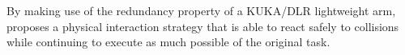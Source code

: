 By making use of the redundancy property of a KUKA/DLR lightweight arm, \cite{de2008exploiting} proposes a physical interaction strategy that is able to react safely to collisions while continuing to execute as much possible of the original task. 
%
%
%
%
%
%
%
%
%
%
%
%
%
%

